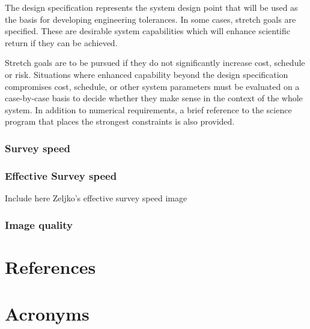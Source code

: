 \documentclass[DM,authoryear,toc]{lsstdoc}
\begin{document}
The design specification represents the system design point that will be used as the basis for
developing engineering tolerances. 
In some cases, stretch goals are specified. 
These are desirable system capabilities which will enhance scientific return if they can be achieved. 

Stretch goals are to be pursued if they do not significantly increase cost, schedule or risk. 
Situations where enhanced capability beyond the design specification compromises cost, schedule, or other system parameters must be evaluated on a case-by-case basis to decide whether they make sense in the context of the whole system.
In addition to numerical requirements, a brief reference to the science program that places the strongest constraints is also provided.

\subsubsection{Survey speed}

\subsubsection{Effective Survey speed}

Include here Zeljko's effective survey speed image 

\subsubsection{Image quality}

\appendix
\section{References} \label{sec:bib}
\renewcommand{\refname}{} %


\section{Acronyms} \label{sec:acronyms}

\end{document}
